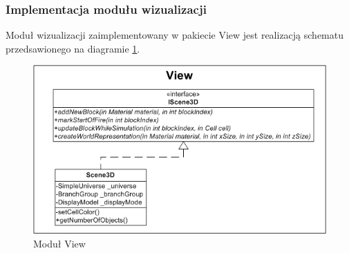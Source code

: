 \subsubsection{Implementacja modułu wizualizacji}
Moduł wizualizacji zaimplementowany w pakiecie View jest realizacją schematu przedsawionego na diagramie \ref{uml_view}.
\begin{figure}
\begin {center}
\includegraphics{uml_view.png} 
\caption {Moduł View}
\label {uml_view}
\end {center}
\end{figure}

